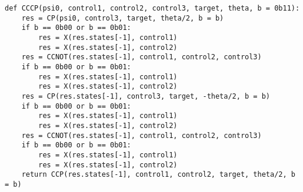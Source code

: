 \begin{verbatim}
def CCCP(psi0, control1, control2, control3, target, theta, b = 0b11):
    res = CP(psi0, control3, target, theta/2, b = b)
    if b == 0b00 or b == 0b01:
        res = X(res.states[-1], control1)
        res = X(res.states[-1], control2)
    res = CCNOT(res.states[-1], control1, control2, control3)
    if b == 0b00 or b == 0b01:
        res = X(res.states[-1], control1)
        res = X(res.states[-1], control2)
    res = CP(res.states[-1], control3, target, -theta/2, b = b)
    if b == 0b00 or b == 0b01:
        res = X(res.states[-1], control1)
        res = X(res.states[-1], control2)
    res = CCNOT(res.states[-1], control1, control2, control3)
    if b == 0b00 or b == 0b01:
        res = X(res.states[-1], control1)
        res = X(res.states[-1], control2)
    return CCP(res.states[-1], control1, control2, target, theta/2, b = b)

\end{verbatim}


